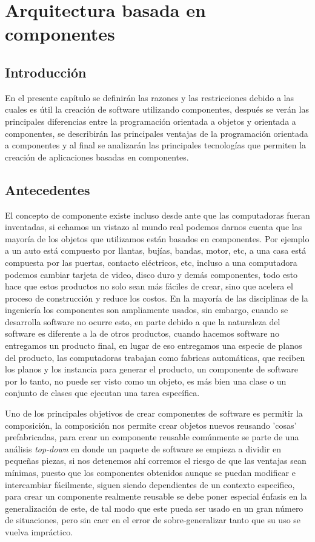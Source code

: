 \documentclass[12pt,a4paper,spanish,openany]{book}
\begin{document}
\chapter{Arquitectura basada en componentes}

\section{Introducción}
En el presente capítulo se definirán las razones y las restricciones debido a
las cuales es útil la creación de software utilizando componentes, después se
verán las principales diferencias entre la programación orientada a objetos y
orientada a componentes, se describirán las principales ventajas de la
programación orientada a componentes  y al final se analizarán las principales
tecnologías que permiten la creación de aplicaciones basadas en componentes.


\section{Antecedentes}

El concepto de componente existe incluso desde ante que las computadoras fueran
inventadas, si echamos un vistazo al mundo real podemos darnos cuenta que las
mayoría de los objetos que utilizamos están basados en componentes. Por ejemplo
a un auto está compuesto por llantas, bujías, bandas, motor, etc, a una casa
está compuesta por las puertas, contacto eléctricos, etc, incluso a una
computadora podemos cambiar tarjeta de video, disco duro y demás componentes,
todo esto hace que estos productos no solo sean más fáciles de crear, sino que
acelera el proceso de construcción y reduce los costos. En la mayoría de las
disciplinas de la ingeniería los componentes son ampliamente usados, sin
embargo, cuando se desarrolla software no ocurre esto, en parte debido a que la naturaleza del software es
diferente a la de otros productos, cuando hacemos
software no entregamos un producto final, en lugar de eso entregamos una especie
de planos del producto, las computadoras trabajan como fabricas automáticas,
que reciben los planos y los instancia para generar el producto, un componente
de software por lo tanto, no puede ser visto como un objeto, es más bien una
clase o un conjunto de clases que ejecutan una tarea específica.

Uno de los principales objetivos de crear componentes de software es permitir la
composición, la composición nos permite crear objetos nuevos reusando 'cosas'
prefabricadas, para crear un componente reusable comúnmente se parte de una
análisis \emph{top-down} en donde un paquete de software se empieza a dividir
en pequeñas piezas, si nos detenemos ahí corremos el riesgo de que las ventajas
sean mínimas, puesto que los componentes obtenidos aunque se puedan modificar e
intercambiar fácilmente, siguen siendo dependientes de un contexto especifico,
para crear un componente realmente reusable se debe poner especial énfasis en la
generalización de este, de tal modo que este pueda ser usado en un gran
número de situaciones, pero sin caer en el error de
sobre-generalizar tanto que su uso se vuelva impráctico.
\end{document}
